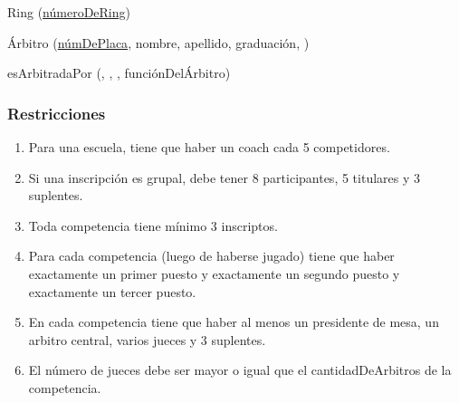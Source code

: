 \par Ring (\underline{númeroDeRing})
\par Árbitro (\underline{númDePlaca}, nombre, apellido, graduación, )

\par esArbitradaPor (\underline{}, \underline{}, , funciónDelÁrbitro)


\subsubsection{Restricciones}

\begin{enumerate}
  \item Para una escuela, tiene que haber un coach cada 5 competidores.
  \item Si una inscripción es grupal, debe tener 8 participantes, 5 titulares y 3 suplentes.
  \item Toda competencia tiene mínimo 3 inscriptos.
  \item Para cada competencia (luego de haberse jugado) tiene que haber exactamente un primer puesto y exactamente un segundo puesto y exactamente un tercer puesto.
  \item En cada competencia tiene que haber al menos un presidente de mesa, un arbitro central, varios jueces y 3 suplentes.
  \item El número de jueces debe ser mayor o igual que el cantidadDeArbitros de la competencia.



\end{enumerate}
